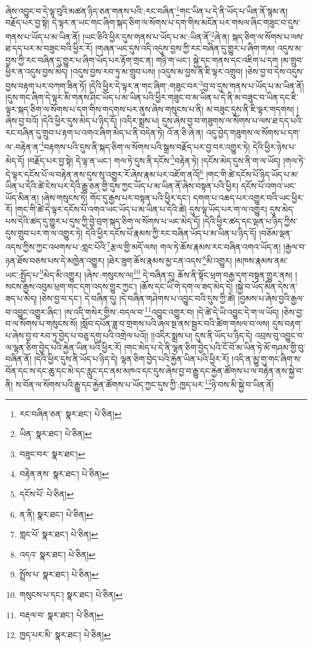 ཞེས་འབྱུང་བ་དེ་ལྟ་བུའི་མཚན་ཉིད་ཅན་གནས་པའི་:རང་བཞིན་\footnote{རང་བཞིན་ཅན་  སྣར་ཐང་།  པེ་ཅིན། }གང་ཡིན་པ་དེ་ནི་ཡོད་པ་ཡིན་ནོ་སྙམ་ན། བརྗོད་པར་བྱ་སྟེ། དེ་ལྟར་ན་ཡང་གང་ཞིག་སྐད་ཅིག་ལ་སོགས་པ་དག་གིས་མངོན་པར་གསལ་ཞིང་གཟུང་བ་དུས་གནས་པ་ཡོད་པ་མ་ཡིན་ནོ། །ཡང་ཅིའི་ཕྱིར་དུས་གནས་པ་ཡོད་པ་མ་:ཡིན་ནོ་\footnote{ཡིན་  སྣར་ཐང་།  པེ་ཅིན། }ཞེ་ན། སྐད་ཅིག་ལ་སོགས་པ་ལས་ཐ་དད་པར་མ་བཟུང་བའི་ཕྱིར་རོ། །གཞན་ཡང་དུས་འདི་འདུས་བྱས་ཀྱི་རང་བཞིན་དུ་གྱུར་པ་ཞིག་གམ། འདུས་མ་བྱས་ཀྱི་རང་བཞིན་དུ་གྱུར་པ་ཞིག་ཡོད་པར་རྟོག་གྲང་ན། གཉི་ག་ཡང་། སྐྱེ་དང་གནས་དང་འཇིག་པ་དག །མ་གྲུབ་ཕྱིར་ན་འདུས་བྱས་མེད། །འདུས་བྱས་རབ་ཏུ་མ་གྲུབ་པས། །འདུས་མ་བྱས་ནི་ཇི་ལྟར་འགྲུབ། །ཅེས་བྱ་བ་དེས་འདུས་བྱས་བརྟག་པར་བཀག་ཟིན་ཏོ། །དེའི་ཕྱིར་དེ་ལྟར་ན་གང་ཞིག་:གཟུང་བར་\footnote{བཟུང་བར་  སྣར་ཐང་། }བྱ་བ་དུས་གནས་པ་ཡོད་པ་མ་ཡིན་ནོ། །དུས་གང་ཞིག་དེ་ལྟར་མི་གནས་ཤིང་ཡོད་པ་མ་ཡིན་པའི་ཕྱིར་གཟུང་བ་མ་ཡིན་པ་དེ་ནི་མ་བཟུང་བ་ཡིན་དང་ཇི་ལྟར་སྐད་ཅིག་ལ་སོགས་པ་དག་གིས་གདགས་པར་ནུས་ཞེས་གསུངས་པ་ནི། མ་བཟུང་དུས་ནི་ཇི་ལྟར་གདགས། །ཞེས་བྱ་བའོ། །དེའི་ཕྱིར་དུས་མེད་པ་ཉིད་དོ། །འདིར་སྨྲས་པ། དུས་ཞེས་བྱ་བ་གཟུགས་ལ་སོགས་པ་ལས་ཐ་དད་པའི་རང་བཞིན་དུ་གྲུབ་པ་རྟག་པ་འགའ་ཞིག་མེད་པ་ནི་བདེན་ཏེ། འོ་ན་ཅི་ཞེ་ན། འདུ་བྱེད་གཟུགས་ལ་སོགས་པ་དག་ལ་:བརྟེན་ན་\footnote{བརྟེན་ནས་  སྣར་ཐང་།  པེ་ཅིན། }བརྟགས་པའི་དུས་ནི་སྐད་ཅིག་ལ་སོགས་པའི་སྒྲས་བརྗོད་པར་བྱ་བར་འགྱུར་ཏེ། དེའི་ཕྱིར་ཉེས་པ་མེད་དོ། །བརྗོད་པར་བྱ་སྟེ། དེ་ལྟ་ན་ཡང་། གལ་ཏེ་དུས་ནི་དངོས་\footnote{དངོས་པོ་  པེ་ཅིན། }བརྟེན་ཏེ། །དངོས་མེད་དུས་ནི་ག་ལ་ཡོད། །གལ་ཏེ་དེ་ལྟར་དངོས་པོ་ལ་བརྟེན་ནས་དུས་སུ་འགྱུར་རོ་ཞེས་རྣམ་པར་འཇོག་ནའོ།\footnote{ན་ནི།  སྣར་ཐང་།  པེ་ཅིན། } །གང་གི་ཚེ་དངོས་པོ་ཉིད་ཡོད་པ་མ་ཡིན་པ་དེའི་ཚེ་ངེས་པར་དེའི་རྒྱུ་ཅན་གྱི་དུས་ཀྱང་ཡོད་པ་མ་ཡིན་ནོ་ཞེས་བསྟན་པའི་ཕྱིར། དངོས་པོ་འགའ་ཡང་ཡོད་མིན་ན། །ཞེས་གསུངས་ཏེ། གོང་དུ་རྒྱས་པར་བསྟན་པའི་ཕྱིར་དང་། དགག་པ་འཆད་པར་འགྱུར་བའི་ཡང་ཕྱིར་རོ། །གང་གི་ཚེ་དེ་ལྟར་དངོས་པོ་འགའ་ཡང་ཡོད་པ་མ་ཡིན་པ་དེའི་ཚེ། དུས་ལྟ་ཡོད་པར་ག་ལ་འགྱུར། དུས་མེད་པས་དེའི་ཚད་དུ་གྱུར་པ་དུས་ཀྱི་བྱེ་བྲག་སྐད་ཅིག་ལ་སོགས་པ་ཡང་མེད་དོ། །དེའི་ཕྱིར་ཚད་དང་ལྡན་པ་ཉིད་ཀྱིས་དུས་གྲུབ་པར་ག་ལ་འགྱུར་ཏེ། དེའི་ཕྱིར་དངོས་པོ་རྣམས་ཀྱི་རང་བཞིན་ཡོད་པ་མ་ཡིན་པ་ཉིད་དོ། །བཅོམ་ལྡན་འདས་ཀྱིས་ཀྱང་འཕགས་པ་:གླང་པོའི་\footnote{གླང་པོ་  སྣར་ཐང་།  པེ་ཅིན། }རྩལ་གྱི་མདོ་ལས། གལ་ཏེ་ཆོས་རྣམས་རང་བཞིན་འགའ་ཡོད་ན། །རྒྱལ་བ་ཉན་ཐོས་བཅས་པས་དེ་མཁྱེན་འགྱུར། །ཐེར་ཟུག་ཆོས་རྣམས་མྱ་ངན་འདས་\footnote{འདའ་  སྣར་ཐང་།  པེ་ཅིན། }མི་འགྱུར། །མཁས་རྣམས་ནམ་ཡང་:སྤྱོད་པ་\footnote{སྤྲོས་པ་  སྣར་ཐང་།  པེ་ཅིན། }མེད་མི་འགྱུར། །ཞེས་:གསུངས་ལ།\footnote{གསུངས་པ་དང་།  སྣར་ཐང་།  པེ་ཅིན། } དེ་བཞིན་དུ། ཆོས་ནི་སྟོང་ཕྲག་བརྒྱ་དག་བསྟན་གྱུར་ནས། །སངས་རྒྱས་འབུམ་ཕྲག་གང་དག་འདས་གྱུར་ཀྱང་། །ཆོས་དང་ཡི་གེ་དག་ལ་ཟད་མེད་དེ། །སྐྱེ་བ་ཡོད་མིན་དེས་ན་ཟད་པ་མེད། །ཅེས་བྱ་བ་དང་། དེ་བཞིན་དུ། །དེ་བཞིན་གཤེགས་པ་འབྱུང་བའི་དུས་ཀྱི་ཚེ། །བྱམས་པ་ཞེས་བྱའི་རྒྱལ་བ་འབྱུང་འགྱུར་ཞིང་། །ས་འདི་གསེར་གྱིས་:བདལ་བ་\footnote{བརྡལ་བ་  སྣར་ཐང་།  པེ་ཅིན། }འབྱུང་འགྱུར་བ། །དེ་ཚེ་དེ་ཡི་འབྱུང་དེ་ག་ལ་ཡོད། །ཅེས་བྱ་བ་ལ་སོགས་པ་གསུངས་སོ། །སློབ་དཔོན་ཟླ་བ་གྲགས་པའི་ཞལ་སྔ་ནས་སྦྱར་བའི་ཚིག་གསལ་བ་ལས། དུས་བརྟག་པ་ཞེས་བྱ་བ་རབ་ཏུ་བྱེད་པ་བཅུ་དགུ་པའི་འགྲེལ་པའོ།། །།འདིར་སྨྲས་པ། དུས་ནི་ཡོད་པ་ཉིད་དེ། འབྲས་བུ་འབྱུང་བ་ལ་ལྷན་ཅིག་བྱེད་པའི་རྐྱེན་ཡིན་པའི་ཕྱིར་རོ། །གང་མེད་པ་དེ་ནི་ལྷན་ཅིག་བྱེད་པའི་ངོ་བོ་མ་ཡིན་ཏེ་མོ་གཤམ་གྱི་བུ་བཞིན་ནོ། །དེའི་ཕྱིར་དུས་ནི་ཡོད་པ་ཉིད་དེ། ལྷན་ཅིག་བྱེད་པའི་རྐྱེན་ཡིན་པའི་ཕྱིར་རོ། །འདི་ན་མྱུ་གུ་གང་ཞིག་ས་བོན་དང་ས་དང་ཆུ་དང་མེ་དང་རླུང་དང་ནམ་མཁའ་དང་དུས་ཞེས་བྱ་བ་རྒྱུ་དང་རྐྱེན་ཚོགས་པ་ལ་བརྟེན་ནས་སྐྱེ་བ་ནི། ས་བོན་ལ་སོགས་པའི་རྒྱུ་དང་རྐྱེན་ཚོགས་པ་ཡོད་ཀྱང་དུས་ཀྱི་:ཁྱད་པར་\footnote{ཁྱད་པར་མི་  སྣར་ཐང་།  པེ་ཅིན། }ཉེ་བས་མི་སྐྱེ་བ་ཡིན་ནོ། 